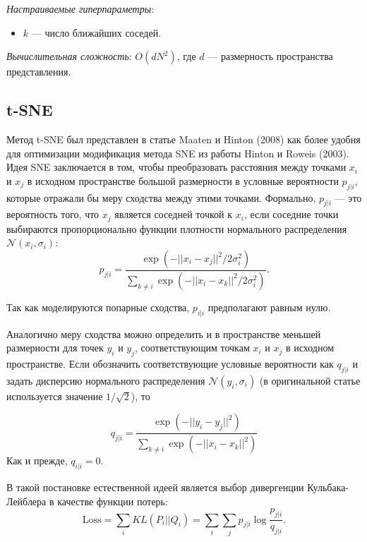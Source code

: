 \documentclass[10pt, a4paper]{extarticle}
\begin{document}
\textit{Настраиваемые гиперпараметры}:

\begin{itemize}
	\item $k$ — число ближайших соседей.
\end{itemize}

\textit{Вычислительная сложность}: $O(dN^2)$, где  $d$ — размерность пространства представления.

\subsection{t-SNE}
Метод t-SNE был представлен в статье Maaten и Hinton (2008) как более удобня для оптимизации \cite{maaten2008visualizing, hinton2003stochastic} модификация метода SNE из работы Hinton и Roweis (2003).
Идея SNE заключается в том, чтобы преобразовать расстояния между точками $x_i$ и $x_j$ в исходном пространстве большой размерности в условные вероятности $p_{j | i}$, которые отражали бы меру сходства между этими точками. 
Формально, $p_{j | i}$ — это вероятность того, что $x_j$ является соседней точкой к $x_i$, если соседние точки выбираются пропорционально функции плотности нормального распределения $\mathcal{N}(x_i, \sigma_i)$:
\[
p_{j | i} = \dfrac{\exp(-||x_i - x_j||^2 / 2\sigma^2_i)}{\sum_{k \ne i}\exp(-||x_i-x_k||^2/2\sigma_i^2)}.
\]

Так как моделируются попарные сходства, $p_{i | i}$ предполагают равным нулю. 

Аналогично меру сходства можно определить и в пространстве меньшей размерности для точек $y_i$ и $y_j$, соответствующим точкам $x_i$ и $x_j$ в исходном пространстве. 
Если обозначить соответствующие условные вероятности как $q_{j | i}$ и задать дисперсию нормального распределения $\mathcal{N}(y_i, \sigma_i)$ (в оригинальной статье используется значение $1/\sqrt{2}$), то

\[
q_{j | i} = \dfrac{\exp(-||y_i - y_j||^2)}{\sum_{k \ne i}\exp(-||x_i-x_k||^2)}
\]
Как и прежде, $q_{i | i} = 0$. 

В такой постановке естественной идеей является выбор дивергенции Кульбака-Лейблера в качестве функции потерь:
\[
\text{Loss} = \sum_i KL(P_i || Q_i) = \sum_i \sum_j p_{j | i} \log \dfrac{p_{j | i}}{q_{j | i}}.
\]
\end{document}
